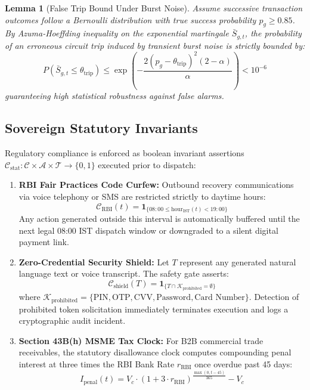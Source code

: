 \documentclass[10pt, twocolumn, a4paper]{article}
\newtheorem{lemma}[theorem]{Lemma}
\begin{document}
\begin{lemma}[False Trip Bound Under Burst Noise]
Assume successive transaction outcomes follow a Bernoulli distribution with true success probability $p_g \ge 0.85$. By Azuma-Hoeffding inequality on the exponential martingale $\bar{S}_{g, t}$, the probability of an erroneous circuit trip induced by transient burst noise is strictly bounded by:
\begin{equation}
  P(\bar{S}_{g, t} \le \theta_{\text{trip}}) \le \exp\left( - \frac{2 (p_g - \theta_{\text{trip}})^2 (2 - \alpha)}{\alpha} \right) < 10^{-6}
\end{equation}
guaranteeing high statistical robustness against false alarms.
\end{lemma}

\subsection{Sovereign Statutory Invariants}
Regulatory compliance is enforced as boolean invariant assertions $\mathcal{C}_{\text{stat}}: \mathcal{C} \times \mathcal{A} \times \mathcal{T} \to \{0, 1\}$ executed prior to dispatch:

\begin{enumerate}[leftmargin=*]
  \item \textbf{RBI Fair Practices Code Curfew:} Outbound recovery communications via voice telephony or SMS are restricted strictly to daytime hours:
  \begin{equation}
    \mathcal{C}_{\text{RBI}}(t) = \mathbf{1}_{\{08:00 \le \text{hour}_{\text{IST}}(t) < 19:00\}}
  \end{equation}
  Any action generated outside this interval is automatically buffered until the next legal 08:00 IST dispatch window or downgraded to a silent digital payment link.
  
  \item \textbf{Zero-Credential Security Shield:} Let $T$ represent any generated natural language text or voice transcript. The safety gate asserts:
  \begin{equation}
    \mathcal{C}_{\text{shield}}(T) = \mathbf{1}_{\{T \cap \mathcal{K}_{\text{prohibited}} = \emptyset\}}
  \end{equation}
  where $\mathcal{K}_{\text{prohibited}} = \{\text{PIN}, \text{OTP}, \text{CVV}, \text{Password}, \text{Card Number}\}$. Detection of prohibited token solicitation immediately terminates execution and logs a cryptographic audit incident.
  
  \item \textbf{Section 43B(h) MSME Tax Clock:} For B2B commercial trade receivables, the statutory disallowance clock computes compounding penal interest at three times the RBI Bank Rate $r_{\text{RBI}}$ once overdue past 45 days:
  \begin{equation}
    I_{\text{penal}}(t) = V_c \cdot \left(1 + 3 \cdot r_{\text{RBI}}\right)^{\frac{\max(0, t - 45)}{365}} - V_c
  \end{equation}
\end{enumerate}
\end{document}
